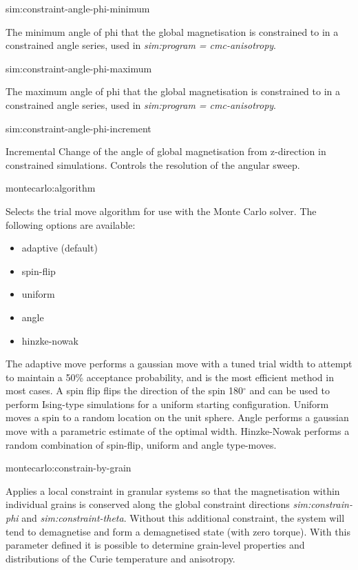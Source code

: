 {\zicf sim:constraint-angle-phi-minimum} The minimum angle of phi that the global magnetisation is constrained to in a constrained angle series, used in \textit{sim:program = cmc-anisotropy}.

{\zicf sim:constraint-angle-phi-maximum} The maximum angle of phi that the global magnetisation is constrained to in a constrained angle series, used in \textit{sim:program = cmc-anisotropy}.

{\zicf sim:constraint-angle-phi-increment} Incremental Change of the angle of global magnetisation from z-direction in constrained simulations. Controls the resolution of the angular sweep.

{\zicf montecarlo:algorithm}
Selects the trial move algorithm for use with the Monte Carlo solver. The
following options are available:

\begin{itemize}
  \item[] adaptive (default)
  \item[] spin-flip
  \item[] uniform
  \item[] angle
  \item[] hinzke-nowak
\end{itemize}

The adaptive move performs a gaussian move with a tuned trial width to attempt
to maintain a 50\% acceptance probability, and is the most efficient method in
most cases. A spin flip flips the direction of the spin 180$^{\circ}$ and can be
used to perform Ising-type simulations for a uniform starting configuration.
Uniform moves a spin to a random location on the unit sphere. Angle performs a
gaussian move with a parametric estimate of the optimal width. Hinzke-Nowak
performs a random combination of spin-flip, uniform and angle type-moves.

{\zicf montecarlo:constrain-by-grain}
Applies a local constraint in granular systems so that the magnetisation within
individual grains is conserved along the global constraint directions
\textit{sim:constrain-phi} and \textit{sim:constraint-theta}. Without this
additional constraint, the system will tend to demagnetise and form a
demagnetised state (with zero torque). With this parameter defined it is
possible to determine grain-level properties and distributions of the Curie
temperature and anisotropy.

